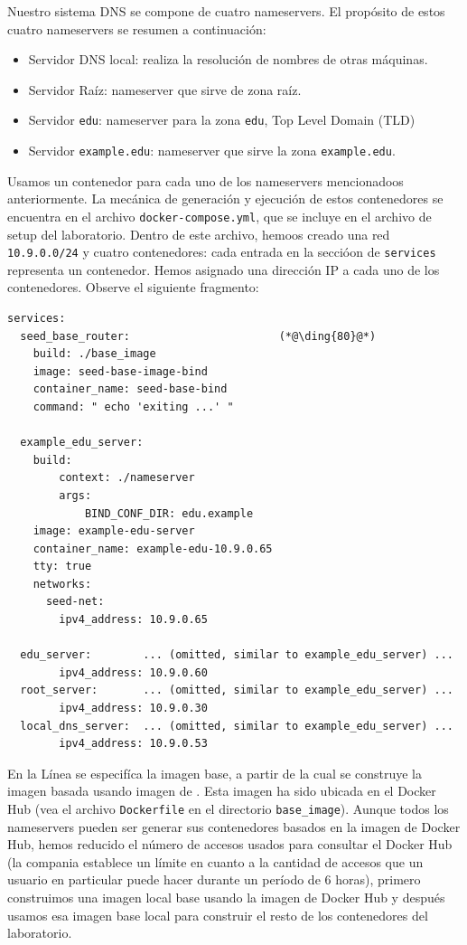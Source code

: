 Nuestro sistema DNS se compone de cuatro nameservers.
El propósito de estos cuatro nameservers se resumen a continuación:

\begin{itemize}[nosep]
\item Servidor DNS local: realiza la resolución de nombres de otras máquinas.
\item Servidor Raíz: nameserver que sirve de zona raíz.
\item Servidor \texttt{edu}: nameserver para la zona \texttt{edu}, Top Level Domain (TLD)
\item Servidor \texttt{example.edu}: nameserver que sirve la zona \texttt{example.edu}. 
\end{itemize}

Usamos un contenedor para cada uno de los nameservers mencionadoos anteriormente.
La mecánica de generación y ejecución de estos contenedores se encuentra en el archivo \texttt{docker-compose.yml}, que se incluye en el archivo de setup del laboratorio. Dentro de este archivo, hemoos creado una red \texttt{10.9.0.0/24} y cuatro contenedores: cada entrada en la seccióon de \texttt{services} representa un contenedor. Hemos asignado una dirección IP a cada uno de los contenedores.
Observe el siguiente fragmento:


\begin{lstlisting}
services:
  seed_base_router:                       (*@\ding{80}@*)
    build: ./base_image
    image: seed-base-image-bind
    container_name: seed-base-bind
    command: " echo 'exiting ...' "

  example_edu_server:
    build:
        context: ./nameserver
        args:
            BIND_CONF_DIR: edu.example
    image: example-edu-server
    container_name: example-edu-10.9.0.65
    tty: true
    networks:
      seed-net:
        ipv4_address: 10.9.0.65

  edu_server:        ... (omitted, similar to example_edu_server) ...
        ipv4_address: 10.9.0.60
  root_server:       ... (omitted, similar to example_edu_server) ...
        ipv4_address: 10.9.0.30
  local_dns_server:  ... (omitted, similar to example_edu_server) ...
        ipv4_address: 10.9.0.53
\end{lstlisting}

En la Línea  se especifíca la imagen base, a partir de la cual se construye la imagen basada usando imagen de .
Esta imagen ha sido ubicada en el Docker Hub (vea el archivo \texttt{Dockerfile} en el directorio \texttt{base\_image}).
Aunque todos los nameservers pueden ser generar sus contenedores basados en la imagen de Docker Hub, hemos reducido el número de accesos usados para consultar el Docker Hub (la compania establece un límite en cuanto a la cantidad de accesos que un usuario en particular puede hacer durante un período de 6 horas), primero construimos una imagen local base usando la imagen de Docker Hub y después usamos esa imagen base local para construir el resto de los contenedores del laboratorio.


